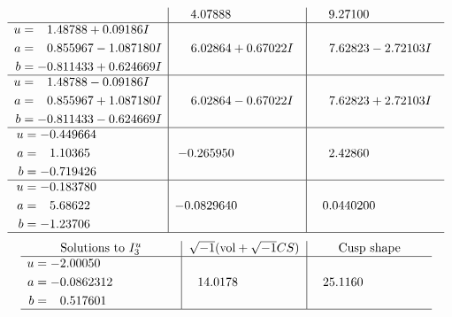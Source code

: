 \documentclass[1p]{elsarticle_modified}
\theoremstyle{definition}
\newcommand{\I}{\sqrt{-1}}
\begin{document}
$$\begin{array}{c|c|c}
 & \phantom{-}4.07888\phantom{ +0.000000I} & \phantom{-}9.27100\phantom{ +0.000000I} \\ \hline\begin{aligned}
u &= \phantom{-}1.48788 + 0.09186 I \\
a &= \phantom{-}0.855967 - 1.087180 I \\
b &= -0.811433 + 0.624669 I\end{aligned}
 & \phantom{-}6.02864 + 0.67022 I & \phantom{-}7.62823 - 2.72103 I \\ \hline\begin{aligned}
u &= \phantom{-}1.48788 - 0.09186 I \\
a &= \phantom{-}0.855967 + 1.087180 I \\
b &= -0.811433 - 0.624669 I\end{aligned}
 & \phantom{-}6.02864 - 0.67022 I & \phantom{-}7.62823 + 2.72103 I \\ \hline\begin{aligned}
u &= -0.449664\phantom{ +0.000000I} \\
a &= \phantom{-}1.10365\phantom{ +0.000000I} \\
b &= -0.719426\phantom{ +0.000000I}\end{aligned}
 & -0.265950\phantom{ +0.000000I} & \phantom{-}2.42860\phantom{ +0.000000I} \\ \hline\begin{aligned}
u &= -0.183780\phantom{ +0.000000I} \\
a &= \phantom{-}5.68622\phantom{ +0.000000I} \\
b &= -1.23706\phantom{ +0.000000I}\end{aligned}
 & -0.0829640\phantom{ +0.000000I} & \phantom{-}0.0440200\phantom{ +0.000000I}\\
 \hline 
 \end{array}$$\newpage$$\begin{array}{c|c|c}  
\text{Solutions to }I^u_{3}& \I (\text{vol} + \sqrt{-1}CS) & \text{Cusp shape}\\
 \hline 
\begin{aligned}
u &= -2.00050\phantom{ +0.000000I} \\
a &= -0.0862312\phantom{ +0.000000I} \\
b &= \phantom{-}0.517601\phantom{ +0.000000I}\end{aligned}
 & \phantom{-}14.0178\phantom{ +0.000000I} & \phantom{-}25.1160\phantom{ +0.000000I}\\
 \hline 
 \end{array}$$\newpage\newpage\renewcommand{\arraystretch}{1}
\end{document}
